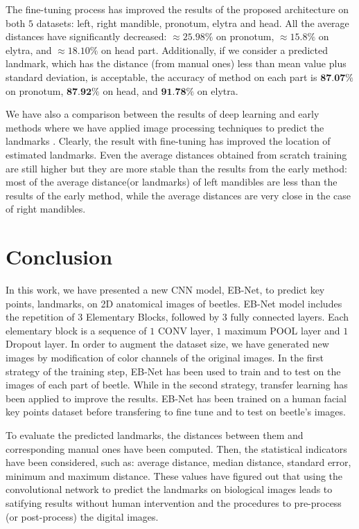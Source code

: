 \documentclass[review]{elsarticle}
\begin{document}
The fine-tuning process has improved the results of the proposed
architecture on both $5$ datasets: left, right mandible, pronotum,
elytra and head. All the average distances have significantly
decreased: $\approx25.98\%$ on pronotum, $\approx15.8\%$ on elytra,
and $\approx18.10\%$  on head part. Additionally, if we consider a
predicted landmark, which has the distance (from manual ones) less
than mean value plus standard deviation, is acceptable, the accuracy
of method on each part is $\textbf{87.07\%}$ on pronotum,
$\textbf{87.92\%}$ on head, and $\textbf{91.78\%}$ on elytra.

We have also a comparison between the results of deep learning and
early methods where we have applied image processing techniques to
predict the landmarks \cite{le2017maelab}. Clearly, the result with
fine-tuning has improved the location of estimated landmarks. Even the
average distances obtained from scratch training are still higher but
they are more stable than the results from the early method: most of
the average distance(or landmarks) of left mandibles are less than the
results of the early method, while the average distances are very
close in the case of right mandibles.

\section{Conclusion}
\label{sconclusion}
In this work, we have presented a new CNN model, EB-Net, to predict
key points, landmarks, on 2D anatomical images of beetles. EB-Net
model includes the repetition of $3$ Elementary Blocks, followed by
$3$ fully connected layers. Each elementary block is a sequence of $1$
CONV layer, $1$ maximum POOL layer and $1$ Dropout layer. In order to
augment the dataset size, we have generated new images by modification
of color channels of the original images. In the first strategy of the training step, EB-Net has been used to train and to test on the images of each part of beetle. While in the second strategy, transfer learning has been applied to improve the results. EB-Net has been trained on a human facial key points dataset before transfering to fine tune and to test on beetle's images.

To evaluate the predicted landmarks, the distances between them and corresponding manual ones have been computed. Then, the statistical indicators have been considered, such as: average distance, median distance, standard error, minimum and maximum distance. These values have figured out that using the convolutional network to predict the landmarks on biological images leads to satifying results without human intervention and the procedures to pre-process (or post-process) the digital images. 
\end{document}
